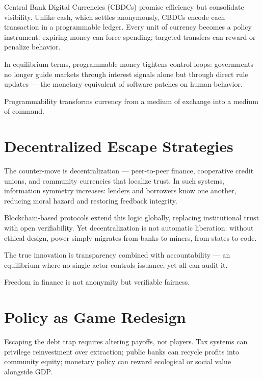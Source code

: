 \documentclass[12pt,twoside]{book}
\begin{document}
Central Bank Digital Currencies (CBDCs) promise efficiency but consolidate visibility.
Unlike cash, which settles anonymously, CBDCs encode each transaction in a programmable ledger.
Every unit of currency becomes a policy instrument: expiring money can force spending;
targeted transfers can reward or penalize behavior.

In equilibrium terms, programmable money tightens control loops:
governments no longer guide markets through interest signals alone but through direct rule
updates --- the monetary equivalent of software patches on human behavior.\\

\begin{keyidea}
Programmability transforms currency from a medium of exchange into a medium of command.
\end{keyidea}

\section{Decentralized Escape Strategies}

The counter-move is decentralization --- peer-to-peer finance, cooperative credit unions, and
community currencies that localize trust.
In such systems, information symmetry increases: lenders and borrowers know one another,
reducing moral hazard and restoring feedback integrity.

Blockchain-based protocols extend this logic globally, replacing institutional trust with open
verifiability.
Yet decentralization is not automatic liberation: without ethical design, power simply migrates
from banks to miners, from states to code.

The true innovation is transparency combined with accountability ---
an equilibrium where no single actor controls issuance, yet all can audit it.\\

\begin{keyidea}
Freedom in finance is not anonymity but verifiable fairness.
\end{keyidea}

\section{Policy as Game Redesign}

Escaping the debt trap requires altering payoffs, not players.
Tax systems can privilege reinvestment over extraction;
public banks can recycle profits into community equity;
monetary policy can reward ecological or social value alongside GDP.
\end{document}
